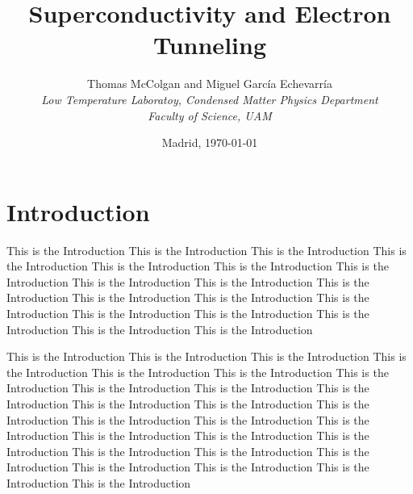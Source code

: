 \documentclass[twocolumn, twoside,a4paper,10pt]{article}
\title{\textbf{Superconductivity and Electron Tunneling}}
\author{Thomas McColgan and Miguel Garc\'ia Echevarr\'ia\\
	\small{\textit{Low Temperature Laboratoy, Condensed Matter Physics Department}} \\
	\small{\textit{Faculty of Science, UAM}}
	}
\date{Madrid, \today}
\begin{document}

\section{Introduction}
This is the Introduction This is the Introduction This is the Introduction This is the Introduction This is the Introduction This is the Introduction This is the Introduction This is the Introduction This is the Introduction This is the Introduction This is the Introduction This is the Introduction This is the Introduction This is the Introduction This is the Introduction This is the Introduction This is the Introduction This is the Introduction 

This is the Introduction This is the Introduction This is the Introduction This is the Introduction This is the Introduction This is the Introduction This is the Introduction This is the Introduction This is the Introduction This is the Introduction This is the Introduction This is the Introduction This is the Introduction This is the Introduction This is the Introduction This is the Introduction This is the Introduction This is the Introduction This is the Introduction This is the Introduction This is the Introduction This is the Introduction This is the Introduction This is the Introduction This is the Introduction This is the Introduction

\end{document}
